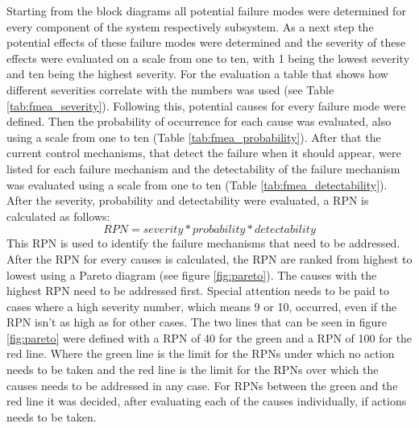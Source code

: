 \documentclass[ExampleMasters.tex]{subfiles}
\begin{document}
Starting from the block diagrams all potential failure modes were determined for every component of the system respectively subsystem. As a next step the potential effects of these failure modes were determined and the severity of these effects were evaluated on a scale from one to ten,  with 1 being the lowest severity and ten being the highest severity. For the evaluation a table that shows how different severities correlate with the numbers was used (see Table \ref{tab:fmea_severity}). 
Following this, potential causes for every failure mode were defined. Then the probability of occurrence for each cause was evaluated, also using a scale from one to ten (Table \ref{tab:fmea_probability}).
After that the current control mechanisms, that detect the failure when it should appear, were listed for each failure mechanism and the detectability of the failure mechanism was evaluated using a scale from one to ten (Table \ref{tab:fmea_detectability}).
After the severity, probability and detectability were evaluated, a \gls{RPN} is calculated as follows: 
\begin{equation*}
RPN=severity*probability*detectability
\end{equation*}      
This \gls{RPN} is used to identify the failure mechanisms that need to be addressed. After the \gls{RPN} for every causes is calculated, the \gls{RPN} are ranked from highest to lowest using a Pareto diagram (see figure \ref{fig:pareto}). The causes with the highest \gls{RPN} need to be addressed first. Special attention needs to be paid to cases where a high severity number, which means 9 or 10, occurred, even if the \gls{RPN} isn't as high as for other cases. The two lines that can be seen in figure \ref{fig:pareto} were defined with a \gls{RPN} of 40 for the green and a \gls{RPN} of 100 for the red line. Where the green line is the limit for the \gls{RPN}s under which no action needs to be taken and the red line is the limit for the \gls{RPN}s over which the causes needs to be addressed in any case. For \gls{RPN}s between the green and the red line it was decided, after evaluating each of the causes individually, if actions needs to be taken.  
		
\end{document}
